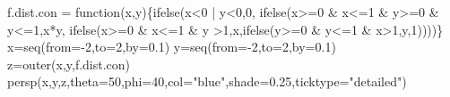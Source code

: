 \documentclass[
  letterpaper,
  DIV=11,
  numbers=noendperiod]{scrreprt}
\newenvironment{Shaded}{\begin{snugshade}}{\end{snugshade}}
\newcommand{\AttributeTok}[1]{\textcolor[rgb]{0.40,0.45,0.13}{#1}}
\newcommand{\ControlFlowTok}[1]{\textcolor[rgb]{0.00,0.23,0.31}{#1}}
\newcommand{\DecValTok}[1]{\textcolor[rgb]{0.68,0.00,0.00}{#1}}
\newcommand{\FloatTok}[1]{\textcolor[rgb]{0.68,0.00,0.00}{#1}}
\newcommand{\FunctionTok}[1]{\textcolor[rgb]{0.28,0.35,0.67}{#1}}
\newcommand{\NormalTok}[1]{\textcolor[rgb]{0.00,0.23,0.31}{#1}}
\newcommand{\OtherTok}[1]{\textcolor[rgb]{0.00,0.23,0.31}{#1}}
\newcommand{\SpecialCharTok}[1]{\textcolor[rgb]{0.37,0.37,0.37}{#1}}
\newcommand{\StringTok}[1]{\textcolor[rgb]{0.13,0.47,0.30}{#1}}
\begin{document}
\begin{Shaded}
\begin{Highlighting}[]
\NormalTok{f.dist.con }\OtherTok{=} \ControlFlowTok{function}\NormalTok{(x,y)\{}\FunctionTok{ifelse}\NormalTok{(x}\SpecialCharTok{\textless{}}\DecValTok{0} \SpecialCharTok{|}\NormalTok{ y}\SpecialCharTok{\textless{}}\DecValTok{0}\NormalTok{,}\DecValTok{0}\NormalTok{,}
                           \FunctionTok{ifelse}\NormalTok{(x}\SpecialCharTok{\textgreater{}=}\DecValTok{0} \SpecialCharTok{\&}\NormalTok{ x}\SpecialCharTok{\textless{}=}\DecValTok{1} \SpecialCharTok{\&}\NormalTok{ y}\SpecialCharTok{\textgreater{}=}\DecValTok{0} \SpecialCharTok{\&}\NormalTok{ y}\SpecialCharTok{\textless{}=}\DecValTok{1}\NormalTok{,x}\SpecialCharTok{*}\NormalTok{y,}
                           \FunctionTok{ifelse}\NormalTok{(x}\SpecialCharTok{\textgreater{}=}\DecValTok{0} \SpecialCharTok{\&}\NormalTok{ x}\SpecialCharTok{\textless{}=}\DecValTok{1} \SpecialCharTok{\&}\NormalTok{ y }\SpecialCharTok{\textgreater{}}\DecValTok{1}\NormalTok{,x,}\FunctionTok{ifelse}\NormalTok{(y}\SpecialCharTok{\textgreater{}=}\DecValTok{0} \SpecialCharTok{\&}\NormalTok{ y}\SpecialCharTok{\textless{}=}\DecValTok{1} \SpecialCharTok{\&}\NormalTok{ x}\SpecialCharTok{\textgreater{}}\DecValTok{1}\NormalTok{,y,}\DecValTok{1}\NormalTok{))))\}}
\NormalTok{x}\OtherTok{=}\FunctionTok{seq}\NormalTok{(}\AttributeTok{from=}\SpecialCharTok{{-}}\DecValTok{2}\NormalTok{,}\AttributeTok{to=}\DecValTok{2}\NormalTok{,}\AttributeTok{by=}\FloatTok{0.1}\NormalTok{)}
\NormalTok{y}\OtherTok{=}\FunctionTok{seq}\NormalTok{(}\AttributeTok{from=}\SpecialCharTok{{-}}\DecValTok{2}\NormalTok{,}\AttributeTok{to=}\DecValTok{2}\NormalTok{,}\AttributeTok{by=}\FloatTok{0.1}\NormalTok{)}
\NormalTok{z}\OtherTok{=}\FunctionTok{outer}\NormalTok{(x,y,f.dist.con)}
\FunctionTok{persp}\NormalTok{(x,y,z,}\AttributeTok{theta=}\DecValTok{50}\NormalTok{,}\AttributeTok{phi=}\DecValTok{40}\NormalTok{,}\AttributeTok{col=}\StringTok{"blue"}\NormalTok{,}\AttributeTok{shade=}\FloatTok{0.25}\NormalTok{,}\AttributeTok{ticktype=}\StringTok{"detailed"}\NormalTok{)}
\end{Highlighting}
\end{Shaded}
\end{document}
